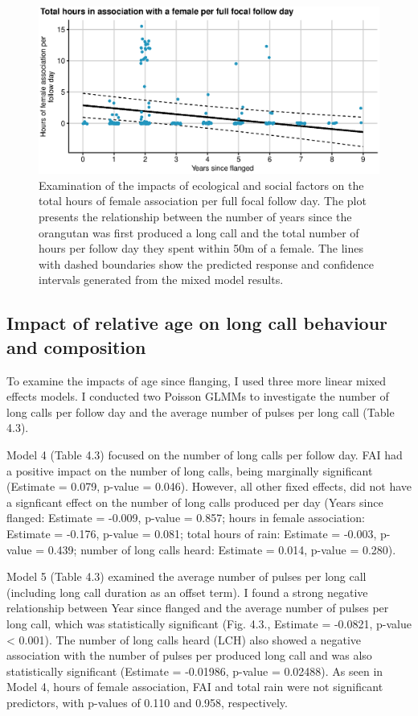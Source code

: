 \begin{figure}
\centering
\includegraphics[width=1\linewidth]{Chapter4/Figs/FemAssocPlot.eps}
\caption{Examination of the impacts of ecological and social factors on the total hours of female association per full focal follow day. The plot presents the relationship between the number of years since the orangutan was first produced a long call and the total number of hours per follow day they spent within 50m of a female. The lines with dashed boundaries show the predicted response and confidence intervals generated from the mixed model results.}
\label{fig:Female Association Dynamics with Flanged Males as a function of Age in Tuanan Field Station}
\end{figure}

\subsection{Impact of relative age on long call behaviour and composition}

To examine the impacts of age since flanging, I used three more linear mixed effects models. I conducted two Poisson GLMMs to investigate the number of long calls per follow day and the average number of pulses per long call (Table 4.3).

Model 4 (Table 4.3) focused on the number of long calls per follow day. FAI had a positive impact on the number of long calls, being marginally significant (Estimate = 0.079, p-value = 0.046). However, all other fixed effects, did not have a signficant effect on the number of long calls produced per day (Years since flanged: Estimate = -0.009, p-value = 0.857; hours in female association: Estimate = -0.176, p-value = 0.081; total hours of rain: Estimate = -0.003, p-value = 0.439; number of long calls heard: Estimate = 0.014, p-value = 0.280).

Model 5 (Table 4.3) examined the average number of pulses per long call (including long call duration as an offset term). I found a strong negative relationship between Year since flanged and the average number of pulses per long call, which was statistically significant (Fig. 4.3., Estimate = -0.0821, p-value < 0.001). The number of long calls heard (LCH) also showed a negative association with the number of pulses per produced long call and was also statistically significant (Estimate = -0.01986, p-value = 0.02488).
As seen in Model 4, hours of female association, FAI and total rain were not significant predictors, with p-values of 0.110 and 0.958, respectively.

